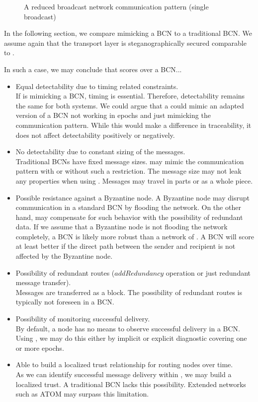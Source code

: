 \begin{figure}[ht]\centering
	
	\caption{A reduced broadcast network communication pattern (single broadcast)}
	\label{fig:bcRedCommPattern}
\end{figure}

In the following section, we compare \MessageVortex{} mimicking a BCN to a traditional BCN. We assume again that the transport layer is steganographically secured comparable to \MessageVortex.

In such a case, we may conclude that \MessageVortex{} scores over a BCN...
\begin{itemize}
	\item Equal detectability due to timing related constraints.\\
	If \MessageVortex{} is mimicking a BCN, timing is essential. Therefore, detectability remains the same for both systems. We could argue that a \MessageVortex{} could mimic an adapted version of a BCN not working in epochs and just mimicking the communication pattern. While this would make a difference in traceability, it does not affect detectability positively or negatively.
	\item No detectability due to constant sizing of the messages.\\
	Traditional BCNs have fixed message sizes. \MessageVortex{} may mimic the communication pattern with or without such a restriction. The message size may not leak any properties when using \MessageVortex{}. Messages may travel in parts or as a whole piece.
	\item Possible resistance against a Byzantine node.
	A Byzantine node may disrupt communication in a standard BCN by flooding the network. On the other hand, \MessageVortex{} may compensate for such behavior with the possibility of redundant data. If we assume that a Byzantine node is not flooding the network completely, a BCN is likely more robust than a network of \VortexNodes{}. A BCN will score at least better if the direct path between the sender and recipient is not affected by the Byzantine node. 
	\item Possibility of redundant routes ($addRedundancy$ operation or just redundant message transfer).\\
	Messages are transferred as a block. The possibility of redundant routes is typically not foreseen in a BCN.
	\item Possibility of monitoring successful delivery.\\
	By default, a node has no means to observe successful delivery in a BCN. Using \MessageVortex{}, we may do this either by implicit or explicit diagnostic covering one or more epochs.
	\item Able to build a localized trust relationship for routing nodes over time.\\
	As we can identify successful message delivery within \MessageVortex{}, we may build a localized trust. A traditional BCN lacks this possibility. Extended networks such as ATOM may surpass this limitation.
\end{itemize}

